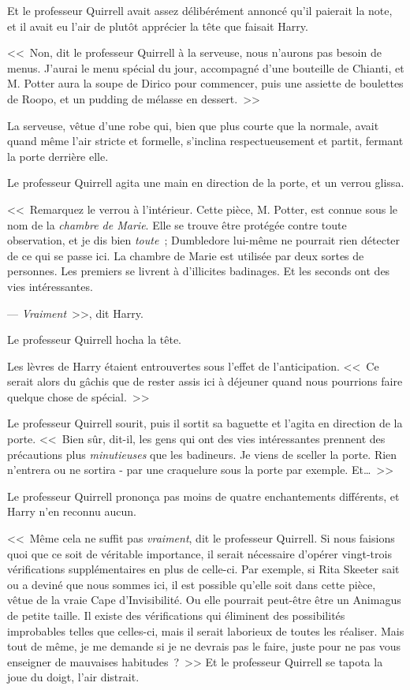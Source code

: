 Et le professeur Quirrell avait assez délibérément annoncé qu'il paierait la note, et il avait eu l'air de plutôt apprécier la tête que faisait Harry.

<<~Non, dit le professeur Quirrell à la serveuse, nous n'aurons pas besoin de menus. J'aurai le menu spécial du jour, accompagné d'une bouteille de Chianti, et M. Potter aura la soupe de Dirico pour commencer, puis une assiette de boulettes de Roopo, et un pudding de mélasse en dessert.~>>

La serveuse, vêtue d’une robe qui, bien que plus courte que la normale, avait quand même l'air stricte et formelle, s'inclina respectueusement et partit, fermant la porte derrière elle.

Le professeur Quirrell agita une main en direction de la porte, et un verrou glissa.

<<~Remarquez le verrou à l'intérieur. Cette pièce, M. Potter, est connue sous le nom de la \emph{chambre de Marie}. Elle se trouve être protégée contre toute observation, et je dis bien \emph{toute}~; Dumbledore lui-même ne pourrait rien détecter de ce qui se passe ici. La chambre de Marie est utilisée par deux sortes de personnes. Les premiers se livrent à d'illicites badinages. Et les seconds ont des vies intéressantes.

--- \emph{Vraiment}~>>, dit Harry.

Le professeur Quirrell hocha la tête.

Les lèvres de Harry étaient entrouvertes sous l'effet de l'anticipation. <<~Ce serait alors du gâchis que de rester assis ici à déjeuner quand nous pourrions faire quelque chose de spécial.~>>

Le professeur Quirrell sourit, puis il sortit sa baguette et l'agita en direction de la porte. <<~Bien sûr, dit-il, les gens qui ont des vies intéressantes prennent des précautions plus \emph{minutieuses} que les badineurs. Je viens de sceller la porte. Rien n'entrera ou ne sortira - par une craquelure sous la porte par exemple. Et…~>>

Le professeur Quirrell prononça pas moins de quatre enchantements différents, et Harry n'en reconnu aucun.

<<~Même cela ne suffit pas \emph{vraiment}, dit le professeur Quirrell. Si nous faisions quoi que ce soit de véritable importance, il serait nécessaire d'opérer vingt-trois vérifications supplémentaires en plus de celle-ci. Par exemple, si Rita Skeeter sait ou a deviné que nous sommes ici, il est possible qu'elle soit dans cette pièce, vêtue de la vraie Cape d'Invisibilité. Ou elle pourrait peut-être être un Animagus de petite taille. Il existe des vérifications qui éliminent des possibilités improbables telles que celles-ci, mais il serait laborieux de toutes les réaliser. Mais tout de même, je me demande si je ne devrais pas le faire, juste pour ne pas vous enseigner de mauvaises habitudes~?~>> Et le professeur Quirrell se tapota la joue du doigt, l'air distrait.


